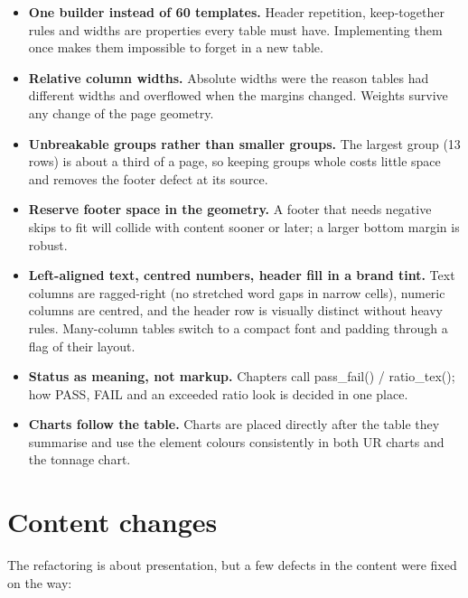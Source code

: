 \documentclass[10pt,a4paper]{article}
\newcommand{\code}[1]{{\small\ttfamily #1}}
\begin{document}
\begin{itemize}
\item \textbf{One builder instead of 60 templates.} Header repetition, keep-together rules and widths are properties every table must have. Implementing them once makes them impossible to forget in a new table.
\item \textbf{Relative column widths.} Absolute widths were the reason tables had different widths and overflowed when the margins changed. Weights survive any change of the page geometry.
\item \textbf{Unbreakable groups rather than smaller groups.} The largest group (13 rows) is about a third of a page, so keeping groups whole costs little space and removes the footer defect at its source.
\item \textbf{Reserve footer space in the geometry.} A footer that needs negative skips to fit will collide with content sooner or later; a larger bottom margin is robust.
\item \textbf{Left-aligned text, centred numbers, header fill in a brand tint.} Text columns are ragged-right (no stretched word gaps in narrow cells), numeric columns are centred, and the header row is visually distinct without heavy rules. Many-column tables switch to a compact font and padding through a flag of their layout.
\item \textbf{Status as meaning, not markup.} Chapters call \code{pass\_fail()} / \code{ratio\_tex()}; how PASS, FAIL and an exceeded ratio look is decided in one place.
\item \textbf{Charts follow the table.} Charts are placed directly after the table they summarise and use the element colours consistently in both UR charts and the tonnage chart.
\end{itemize}

\section{Content changes}\label{sec:content}

The refactoring is about presentation, but a few defects in the content were fixed on the way:
\end{document}
